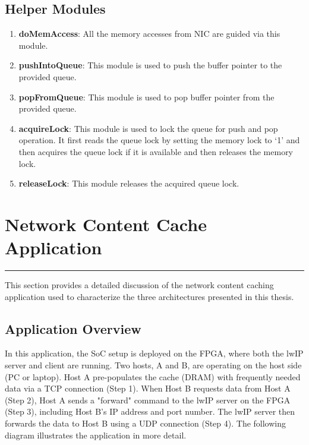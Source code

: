 \documentclass[12pt]{report}
\begin{document}
\begin{appendices}
		\section{Helper Modules}
			\begin{enumerate} 
				\item \textbf{doMemAccess}: All the memory accesses from NIC are guided via this module. 
				\item \textbf{pushIntoQueue}: This module is used to push the buffer pointer to the provided queue. 
				\item \textbf{popFromQueue}: This module is used to pop buffer pointer from the provided queue. 
				\item \textbf{acquireLock}: This module is used to lock the queue for push and pop operation. It first reads the queue lock by setting the memory lock to `1' and then acquires the queue lock if it is available and then releases the memory lock.
				\item \textbf{releaseLock}: This module releases the acquired queue lock.
			\end{enumerate}	

  \chapter{Network Content Cache Application}
  \rule[10pt]{\linewidth}{3pt} This section provides a detailed discussion of the network content caching application used to characterize the three architectures presented in this thesis.
\section{Application Overview}
In this application, the SoC setup is deployed on the FPGA, where both the lwIP server and client are running. Two hosts, A and B, are operating on the host side (PC or laptop). Host A pre-populates the cache (DRAM) with frequently needed data via a TCP connection (Step 1). When Host B requests data from Host A (Step 2), Host A sends a "forward" command to the lwIP server on the FPGA (Step 3), including Host B's IP address and port number. The lwIP server then forwards the data to Host B using a UDP connection (Step 4). The following diagram illustrates the application in more detail.



\end{appendices}
\end{document}
